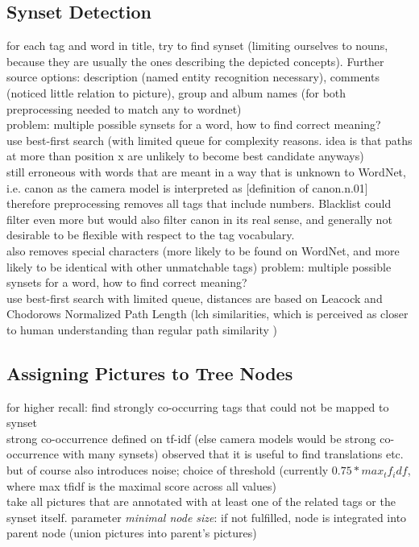 \subsection{Synset Detection}
for each tag and word in title, try to find synset (limiting ourselves to nouns, because they are usually the ones describing the depicted concepts). Further source options: description (named entity recognition necessary), comments (noticed little relation to picture), group and album names (for both preprocessing needed to match any to wordnet)  \\
problem: multiple possible synsets for a word, how to find correct meaning? \\
use best-first search (with limited queue for complexity reasons. idea is that paths at more than position x are unlikely to become best candidate anyways) \\
still erroneous with words that are meant in a way that is unknown to WordNet, i.e. canon as the camera model is interpreted as [definition of canon.n.01]  \\
therefore preprocessing removes all tags that include numbers. Blacklist could filter even more but would also filter canon in its real sense, and generally not desirable to be flexible with respect to the tag vocabulary.  \\
also removes special characters (more likely to be found on WordNet, and more likely to be identical with other unmatchable tags) 
problem: multiple possible synsets for a word, how to find correct meaning? \\
use best-first search with limited queue, distances are based on Leacock and Chodorows Normalized Path Length (lch similarities, which is perceived as closer to human understanding than regular path similarity \cite{budanitsky01} )

\subsection{Assigning Pictures to Tree Nodes}
for higher recall: find strongly co-occurring tags that could not be mapped to synset \\
strong co-occurrence defined on tf-idf (else camera models would be strong co-occurrence with many synsets)
observed that it is useful to find translations etc. but of course also introduces noise; choice of threshold (currently $0.75 * max_tf_idf$, where max tfidf is the maximal score across all values) \\
take all pictures that are annotated with at least one of the related tags or the synset itself. parameter \emph{minimal node size}: if not fulfilled, node is integrated into parent node (union pictures into parent's pictures)
